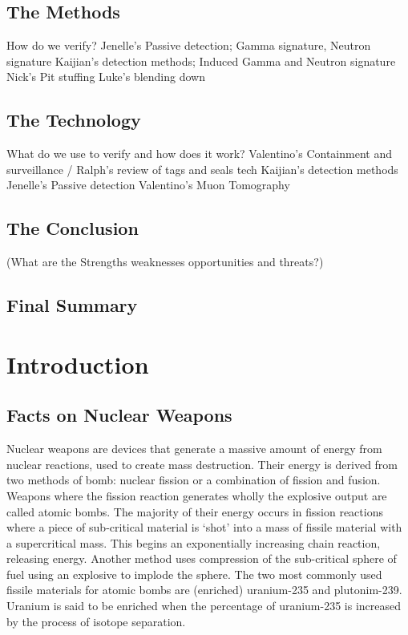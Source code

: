 \documentclass[twocolumn,a4paper]{article}
\begin{document}
\subsection*{The Methods}
How do we verify?
Jenelle's Passive detection; Gamma signature, Neutron signature
Kaijian's detection methods; Induced Gamma and Neutron signature 
Nick's Pit stuffing
Luke's blending down
\subsection*{The Technology}
What do we use to verify and how does it work?
Valentino's Containment and surveillance / Ralph's review of tags and seals tech
Kaijian's detection methods
Jenelle's Passive detection
Valentino's Muon Tomography 

\subsection*{The Conclusion}
(What are the Strengths weaknesses opportunities and threats?)
\subsection*{Final Summary}

\tableofcontents

\section{Introduction}

\subsection{Facts on Nuclear Weapons}
Nuclear weapons are devices that generate a massive amount of energy 
from nuclear reactions, used to create mass destruction. Their energy 
is derived from two methods of bomb: nuclear fission or a combination 
of fission and fusion. Weapons where the fission reaction generates 
wholly the explosive output are called atomic bombs. The majority of 
their energy occurs in fission reactions where a piece of sub-critical 
material is ‘shot’ into a mass of fissile material with a supercritical 
mass. This begins an exponentially increasing chain reaction, releasing 
energy. Another method uses compression of the sub-critical sphere of 
fuel using an explosive to implode the sphere. The two most commonly 
used fissile materials for atomic bombs are (enriched) uranium-235 and 
plutonim-239. Uranium is said to be enriched when the percentage of 
uranium-235 is increased by the process of isotope separation.
\end{document}
